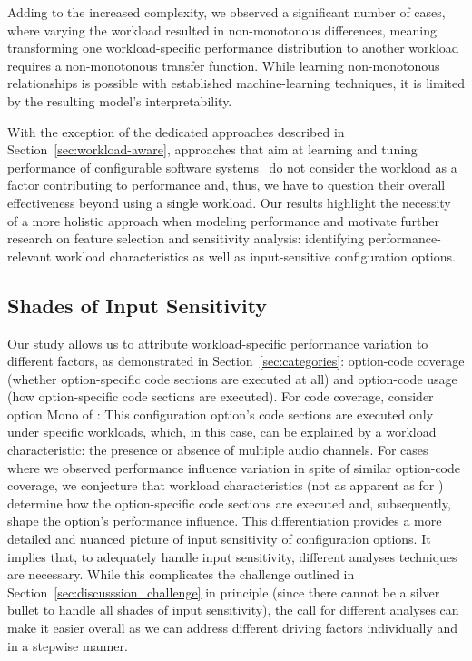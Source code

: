 Adding to the increased complexity, we observed a significant number of cases, where varying the workload resulted in non-mo\-no\-to\-nous differences, meaning transforming one workload-specific performance distribution to another workload requires a non-mono\-tonous transfer function. While learning non-mo\-no\-to\-nous relationships is possible with established machine-learning techniques, it is limited by the resulting model's interpretability. 

With the exception of the dedicated approaches described in Section~\ref{sec:workload-aware}, approaches that aim at learning and tuning performance of configurable software systems~\cite{siegmundPerformanceinfluenceModelsHighly2015,haDeepPerf2019,perfAL,guoVariabilityawarePerformancePrediction2013,sarkarCostEfficientSamplingPerformance,guo_2018_data,fourier_learning_2015,perLasso} do not consider the workload as a factor contributing to performance and, thus, we have to question their overall effectiveness beyond using a single workload. Our results highlight the necessity of a more holistic approach when modeling performance and motivate further research on feature selection and sensitivity analysis: identifying performance-relevant workload characteristics as well as input-sensitive configuration options.

\subsection{Shades of Input Sensitivity}
Our study allows us to attribute workload-specific performance variation to different factors, as demonstrated in Section~\ref{sec:categories}: option-code coverage (whether option-specific code sections are executed at all) and option-code usage (how option-specific code sections are executed). For code coverage, consider option \textsf{Mono} of \jumper: This configuration option's code sections are executed only under specific workloads, which, in this case, can be explained by a workload characteristic: the presence or absence of multiple audio channels. For cases where we observed performance influence variation in spite of similar option-code coverage, we conjecture that workload characteristics (not as apparent as for \jumper) determine how the option-specific code sections are executed and, subsequently, shape the option’s performance influence. 
This differentiation provides a more detailed and nuanced picture of input sensitivity of configuration options. It implies that, to adequately handle input sensitivity, different analyses techniques are necessary. While this complicates the challenge outlined in Section~\ref{sec:discusssion_challenge} in principle (since there cannot be a silver bullet to handle all shades of input sensitivity), the call for different analyses can make it easier overall as we can address different driving factors individually and in a stepwise manner.

